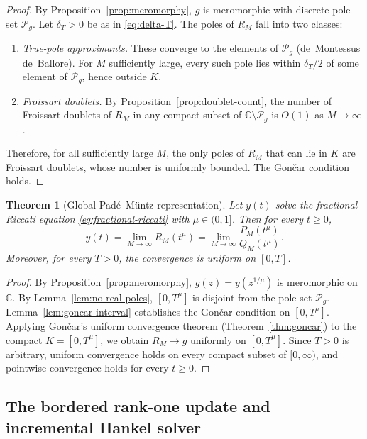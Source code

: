 \documentclass[11pt]{article}
\newtheorem{theorem}{Theorem}[section]
\theoremstyle{definition}
\theoremstyle{remark}
\begin{document}
\begin{proof}
By Proposition~\ref{prop:meromorphy}, $g$ is meromorphic with discrete pole set $\mathcal{P}_{g}$. Let $\delta_{T}>0$ be as in \eqref{eq:delta-T}. The poles of $R_{M}$ fall into two classes:
\begin{enumerate}[label=(\alph*)]
\item \emph{True-pole approximants.} These converge to the elements of $\mathcal{P}_{g}$ (de~Montessus de~Ballore). For $M$ sufficiently large, every such pole lies within $\delta_{T}/2$ of some element of $\mathcal{P}_{g}$, hence outside $K$.
\item \emph{Froissart doublets.} By Proposition~\ref{prop:doublet-count}, the number of Froissart doublets of $R_{M}$ in any compact subset of $\mathbb{C}\setminus\mathcal{P}_{g}$ is $O(1)$ as $M\to\infty$.
\end{enumerate}
Therefore, for all sufficiently large $M$, the only poles of $R_{M}$ that can lie in $K$ are Froissart doublets, whose number is uniformly bounded. The Gon\v{c}ar condition holds.
\end{proof}

\begin{theorem}[Global Pad\'e--M\"untz representation]
\label{thm:global}
Let $y(t)$ solve the fractional Riccati equation \eqref{eq:fractional-riccati} with $\mu\in(0,1]$. Then for every $t\ge 0$,
\begin{equation}
\boxed{\;y(t)=\lim_{M\to\infty}R_{M}(t^{\mu})=\lim_{M\to\infty}\frac{P_{M}(t^{\mu})}{Q_{M}(t^{\mu})}.\;}
\label{eq:global-pade}
\end{equation}
Moreover, for every $T>0$, the convergence is uniform on $[0,T]$.
\end{theorem}

\begin{proof}
By Proposition~\ref{prop:meromorphy}, $g(z)=y(z^{1/\mu})$ is meromorphic on $\mathbb{C}$. By Lemma~\ref{lem:no-real-poles}, $[0,T^{\mu}]$ is disjoint from the pole set $\mathcal{P}_{g}$. Lemma~\ref{lem:goncar-interval} establishes the Gon\v{c}ar condition on $[0,T^{\mu}]$. Applying Gon\v{c}ar's uniform convergence theorem (Theorem~\ref{thm:goncar}) to the compact $K=[0,T^{\mu}]$, we obtain $R_{M}\to g$ uniformly on $[0,T^{\mu}]$. Since $T>0$ is arbitrary, uniform convergence holds on every compact subset of $[0,\infty)$, and pointwise convergence holds for every $t\ge 0$.
\end{proof}

\subsection{The bordered rank-one update and incremental Hankel solver}
\label{sec:rank-one}
\end{document}
